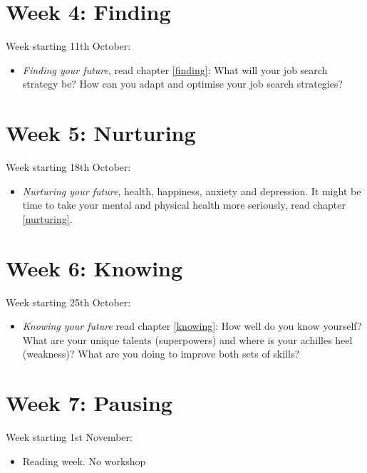\documentclass[
]{book}
\providecommand{\tightlist}{%
  \setlength{\itemsep}{0pt}\setlength{\parskip}{0pt}}
\begin{document}
\hypertarget{week4}{%
\section{Week 4: Finding}\label{week4}}

Week starting 11th October:

\begin{itemize}
\tightlist
\item
  \emph{Finding your future}, read chapter \ref{finding}: What will your job search strategy be? How can you adapt and optimise your job search strategies?
\end{itemize}

\hypertarget{week5}{%
\section{Week 5: Nurturing}\label{week5}}

Week starting 18th October:

\begin{itemize}
\tightlist
\item
  \emph{Nurturing your future}, health, happiness, anxiety and depression. It might be time to take your mental and physical health more seriously, read chapter \ref{nurturing}.
\end{itemize}

\hypertarget{week6}{%
\section{Week 6: Knowing}\label{week6}}

Week starting 25th October:

\begin{itemize}
\tightlist
\item
  \emph{Knowing your future} read chapter \ref{knowing}: How well do you know yourself? What are your unique talents (superpowers) and where is your achilles heel (weakness)? What are you doing to improve both sets of skills?
\end{itemize}

\hypertarget{week7}{%
\section{Week 7: Pausing}\label{week7}}

Week starting 1st November:

\begin{itemize}
\tightlist
\item
  Reading week. No workshop
\end{itemize}
\end{document}
